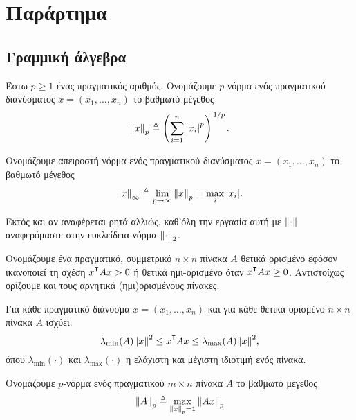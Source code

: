 \chapter{Παράρτημα}
\label{chap:appendix}

\section{Γραμμική άλγεβρα}

    \begin{definition}
        Έστω $p \geq 1$ ένας πραγματικός αριθμός. Ονομάζουμε $p$-νόρμα ενός πραγματικού διανύσματος $x = (x_1, \ldots, x_n)$ το βαθμωτό μέγεθος
        \[
            \norm{x}_p \triangleq \pqty{\sum_{i=1}^n \abs{x_i}^p}^{\flatfrac{1}{p}}.
        \]
    \end{definition}
    
    \begin{definition}
        Ονομάζουμε απειροστή νόρμα ενός πραγματικού διανύσματος $x = (x_1, \ldots, x_n)$ το βαθμωτό μέγεθος
        \[
            \norm{x}_\infty \triangleq \lim_{p \rightarrow \infty} \norm{x}_p = \max_i \abs{x_i}.
        \]
    \end{definition}
    
    \begin{convention}
        Εκτός και αν αναφέρεται ρητά αλλιώς, καθ'όλη την εργασία αυτή με $\norm{\cdot}$ αναφερόμαστε στην ευκλείδεια νόρμα $\norm{\cdot}_2$.
    \end{convention}
    
    \begin{definition}
        Ονομάζουμε ένα πραγματικό, συμμετρικό $n \times n$ πίνακα $A$ θετικά ορισμένο εφόσον ικανοποιεί τη σχέση $x^\T A x > 0$ ή θετικά ημι-ορισμένο όταν $x^\T A x \geq 0$. Αντιστοίχως ορίζουμε και τους αρνητικά (ημι)ορισμένους πίνακες.
    \end{definition}
    
    \begin{property}
        Για κάθε πραγματικό διάνυσμα $x = (x_1, \ldots, x_n)$ και για κάθε θετικά ορισμένο $n \times n$ πίνακα $A$ ισχύει:
        \[
            \lambda_{\min}(A) \norm{x}^2 \leq x^\T A x \leq \lambda_{\max}(A) \norm{x}^2,
        \]
        όπου $\lambda_{\min}(\cdot)$ και $\lambda_{\max}(\cdot)$ η ελάχιστη και μέγιστη ιδιοτιμή ενός πίνακα. 
    \end{property}
    
    \begin{definition}
        Ονομάζουμε $p$-νόρμα ενός πραγματικού $m \times n$ πίνακα $A$ το βαθμωτό μέγεθος
        \[
        \norm{A}_p \triangleq \max_{\norm{x}_p = 1} \norm{Ax}_p
        \]
    \end{definition}
    
